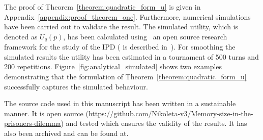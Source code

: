 The proof of Theorem~\ref{theorem:quadratic_form_u} is given in
Appendix~\ref{appendix:proof_theorem_one}. Furthermore, numerical simulations
have been carried out to validate the result. The simulated utility, which is
denoted as \(U_q(p)\), has been calculated using~\cite{axelrodproject} an open
source research framework for the study of the IPD (\cite{axelrodproject} is
described in~\cite{Knight2016}). For smoothing the simulated results the utility
has been estimated in a tournament of 500 turns and 200 repetitions.
Figure~\ref{fig:analytical_simulated} shows two examples demonstrating that the
formulation of Theorem~\ref{theorem:quadratic_form_u} successfully captures the
simulated behaviour.

The source code used in this manuscript has been written in a sustainable manner.
It is open source (\url{https://github.com/Nikoleta-v3/Memory-size-in-the-prisoners-dilemma})
and tested which ensures the validity of the results. It has also been archived
and can be found at.

